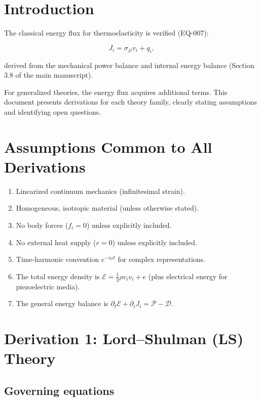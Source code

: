 \documentclass{article}
\begin{document}
\section{Introduction}

The classical energy flux for thermoelasticity is verified (EQ-007):

\begin{equation}
J_i = \sigma_{ji}v_i + q_i,
\label{ef:classical}
\end{equation}

derived from the mechanical power balance and internal energy balance (Section 3.8 of the main manuscript).

For generalized theories, the energy flux acquires additional terms. This document presents derivations for each theory family, clearly stating assumptions and identifying open questions.

\section{Assumptions Common to All Derivations}

\begin{enumerate}
\item Linearized continuum mechanics (infinitesimal strain).
\item Homogeneous, isotropic material (unless otherwise stated).
\item No body forces ($f_i = 0$) unless explicitly included.
\item No external heat supply ($r = 0$) unless explicitly included.
\item Time-harmonic convention $e^{-i\omega t}$ for complex representations.
\item The total energy density is $\mathcal{E} = \frac{1}{2}\rho v_i v_i + e$ (plus electrical energy for piezoelectric media).
\item The general energy balance is $\partial_t\mathcal{E} + \partial_i J_i = \mathcal{P} - \mathcal{D}$.
\end{enumerate}

\section{Derivation 1: Lord--Shulman (LS) Theory}

\subsection{Governing equations}
\end{document}
